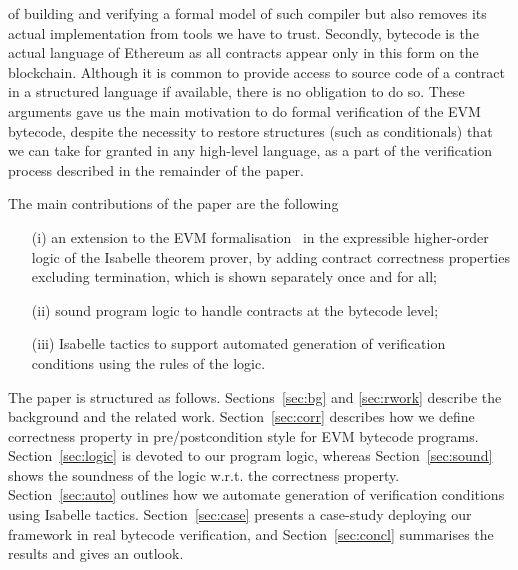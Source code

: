 \documentclass[sigplan,10pt,review]{acmart}\settopmatter{printfolios=true,printccs=false,printacmref=false}
\begin{document}
of building and verifying a formal model of such compiler but also removes its actual implementation from tools we have to trust.
Secondly, bytecode is the actual language of Ethereum as all contracts appear only in this form on the blockchain.
Although it is common to provide access to source code of a contract in a structured language if available, there is
no obligation to do so. These arguments gave us the main motivation to do formal verification of
the EVM bytecode, despite the necessity to restore structures (such as conditionals) that we can take 
for granted in any high-level language,
as a part of the verification process described in the remainder of the paper. 

The main contributions of the paper are the following
\begin{itemize}
\item[(i)] an extension to the EVM formalisation~\cite{Yoichi} in the expressible
           higher-order logic of the Isabelle theorem prover,
           by adding contract correctness properties excluding termination, which is shown
           separately once and for all;
\item[(ii)] sound program logic to handle contracts at the bytecode level;
\item[(iii)] Isabelle tactics to support automated generation of verification
            conditions using the rules of the logic.
\end{itemize}
         
The paper is structured as follows. Sections~\ref{sec:bg} and \ref{sec:rwork} describe the background
and the related work. Section~\ref{sec:corr} describes how we define correctness property in pre/postcondition
style for EVM bytecode programs. Section~\ref{sec:logic} is devoted to our program logic, 
whereas Section~\ref{sec:sound} shows the soundness of the logic
w.r.t. the correctness property. Section~\ref{sec:auto} outlines how we automate generation of verification
conditions using Isabelle tactics. Section~\ref{sec:case} presents a case-study deploying our framework in 
real bytecode verification, and
Section~\ref{sec:concl} summarises the results and gives an outlook.      
%
\end{document}
